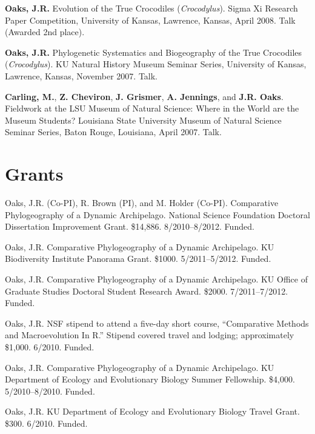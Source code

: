 \documentclass[10pt]{article}
\newcommand{\ignore}[1]{}
\newcommand{\myHangIndent}{\hangindent=5mm}
\begin{document}
\myHangIndent
{\bf Oaks, J.R.}
Evolution of the True Crocodiles (\emph{Crocodylus}).
Sigma Xi Research Paper Competition, University of Kansas, Lawrence, Kansas, April 2008.
Talk (Awarded 2nd place).

\myHangIndent
{\bf Oaks, J.R.}
Phylogenetic Systematics and Biogeography of the True Crocodiles
(\emph{Crocodylus}).
KU Natural History Museum Seminar Series, University of Kansas, Lawrence,
Kansas, November 2007.
Talk.

\myHangIndent
{\bf Carling, M.}, {\bf Z. Cheviron}, {\bf J. Grismer}, {\bf A. Jennings}, and
{\bf J.R. Oaks}.
Fieldwork at the LSU Museum of Natural Science: Where in the World are the
Museum Students?
Louisiana State University Museum of Natural Science Seminar Series, Baton
Rouge, Louisiana, April 2007.
Talk.

\section*{Grants}
\myHangIndent
Oaks, J.R. (Co-PI), R. Brown (PI), and M. Holder (Co-PI).
Comparative Phylogeography of a Dynamic Archipelago.
National Science Foundation Doctoral Dissertation Improvement Grant.
\$14,886.
8/2010--8/2012.
Funded.

\myHangIndent
Oaks, J.R.
Comparative Phylogeography of a Dynamic Archipelago.
KU Biodiversity Institute Panorama Grant.
\$1000.
5/2011--5/2012.
Funded.

\myHangIndent
Oaks, J.R.
Comparative Phylogeography of a Dynamic Archipelago.
KU Office of Graduate Studies Doctoral Student Research Award.
\$2000.
7/2011--7/2012.
Funded.

\ignore{
\myHangIndent
Oaks, J.R.
Comparative Phylogeography of a Dynamic Archipelago.
The Society for the Study of Evolution Rosemary Grant Graduate Research Award.
\$2,085.
7/2010--7/2011.
Not funded.
}
\myHangIndent
Oaks, J.R.
NSF stipend to attend a five-day short course, ``Comparative Methods and
Macroevolution In R.''
Stipend covered travel and lodging; approximately \$1,000.
6/2010.
Funded.

\ignore{
\myHangIndent
Oaks, J.R.
Comparative Phylogeography of a Dynamic Archipelago.
KU Graduate Studies Summer Research Fellowship.
\$4,000.
5/2010--8/2010.
Not funded.
}
\myHangIndent
Oaks, J.R.
Comparative Phylogeography of a Dynamic Archipelago.
KU Department of Ecology and Evolutionary Biology Summer Fellowship.
\$4,000.
5/2010--8/2010.
Funded.

\myHangIndent
Oaks, J.R.
KU Department of Ecology and Evolutionary Biology Travel Grant.
\$300.
6/2010.
Funded.
\end{document}
